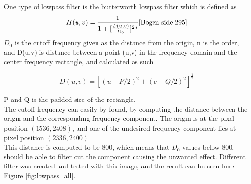 One type of lowpass filter is the butterworth lowpass filter which is defined as
\begin{equation}
	H(u,v) = \frac{1}{1+[\frac{D(u,v)}{D_0}]^{2n}}
	\label{eq:LBP}
	\cite{Bogen side 295}
\end{equation}
$D_0$ is the cutoff frequency given as the distance from the origin, n  is the order,  and D(u,v) is distance between a point (u,v) in the frequency domain and the center frequency rectangle, and  calculated as such. 

\begin{equation}
D(u,v) = [(u-P/2)^2 + (v-Q/2)^2]^{\frac{1}{2}} 
\end{equation}

P and Q is the padded size of the rectangle. \\


The cutoff frequency can easily by found, by computing the distance between the origin and the corresponding frequency component. The origin is at the pixel position $(1536 ,2408)$, and one of the undesired frequency component lies at pixel position $(2336,2400)$ \\


This distance is computed to be 800, which means that $D_0$ values below 800, should be able to filter out the component causing the unwanted effect.  Different filter was created and tested with this image, and the result can be  seen here Figure \ref{fig:lowpass_all}.  \\

